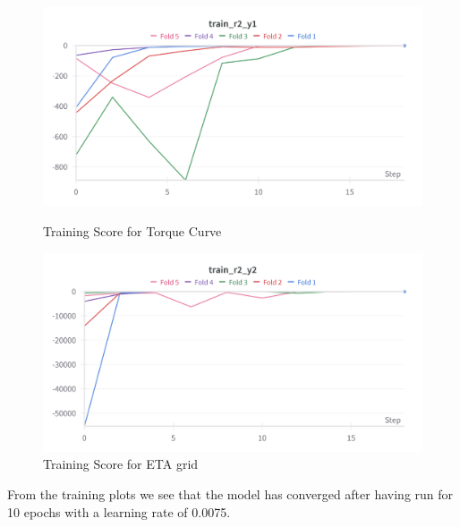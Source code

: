 \documentclass{report} %
\begin{document}
\begin{figure}[h]
    \centering
    \begin{minipage}[b]{0.3\textwidth}
        \includegraphics[width=\textwidth]{./ReportImages/train_r2_y1.png}
        \caption{Training Score for Torque Curve}
        \label{fig:Training Score for Torque Curve}
    \end{minipage}
    \hfill
    \begin{minipage}[b]{0.3\textwidth}
        \includegraphics[width=\textwidth]{./ReportImages/train_r2_y2.png}
        \caption{Training Score for ETA grid}
        \label{fig:Training Score for ETA grid}
    \end{minipage}
\end{figure}

From the training plots we see that the model has converged after having run for 10 epochs with a learning rate of 0.0075.
\end{document}
